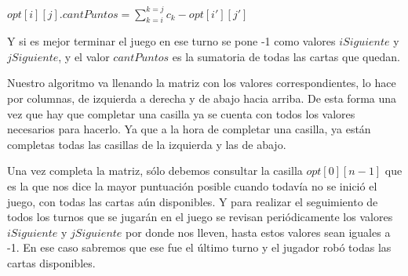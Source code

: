 $opt[i][j].cantPuntos = \sum_{k=i}^{k=j} c_k - opt[i'][j']$

Y si es mejor terminar el juego en ese turno se pone -1 como valores $iSiguiente$ y $jSiguiente$, y el valor $cantPuntos$ es la sumatoria de todas las cartas que quedan.

Nuestro algoritmo va llenando la matriz con los valores correspondientes, lo hace por columnas, de izquierda a derecha y de abajo hacia arriba. De esta forma una vez que hay que completar una casilla ya se cuenta con todos los valores necesarios para hacerlo. Ya que a la hora de completar una casilla, ya están completas todas las casillas de la izquierda y las de abajo. 

Una vez completa la matriz, sólo debemos consultar la casilla $opt[0][n-1]$ que es la que nos dice la mayor puntuación posible cuando todavía no se inició el juego, con todas las cartas aún disponibles. Y para realizar el seguimiento de todos los turnos que se jugarán en el juego se revisan periódicamente los valores $iSiguiente$ y $jSiguiente$ por donde nos lleven, hasta estos valores sean iguales a -1. En ese caso sabremos que ese fue el último turno y el jugador robó todas las cartas disponibles.